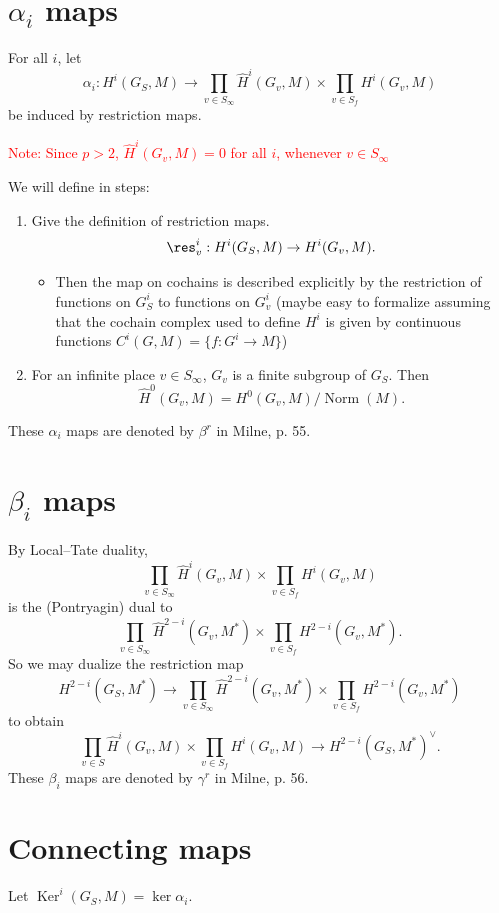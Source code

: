 \documentclass[11pt]{article}
\begin{document}
\section{$\alpha_i$ maps}
For all \( i \), let
\[ \alpha_i: H^i(G_{S},M)\to \prod_{v\in S_\infty}\widehat{H}^i(G_v,M)\times\prod_{v\in S_f}H^i(G_v,M) \]
be induced by restriction maps.

\textcolor{red}{Note: Since \( p>2 \), \( \widehat{H}^i(G_v,M)=0 \) for all \( i \), whenever \( v\in S_\infty \)}

\bigskip
We will define in steps:
\begin{enumerate}
    \item Give the definition of restriction maps.
\[
\res_v^i : H^i (G_S, M) \to H^i (G_v, M).
\]

\begin{itemize}
    \item Then the map on cochains is described explicitly by the restriction of functions on $G_S^i$ to functions on $G_v^i$ (maybe easy to formalize assuming that the cochain complex used to define $H^i$ is given by continuous functions \( C^i(G, M) = \{f: G^i \to M\} \))
\end{itemize}
\item For an infinite place \( v\in S_\infty \), \( G_v \) is a finite subgroup of \( G_S \). Then
\[ \widehat{H}^0(G_v,M) = H^0(G_v,M)/\operatorname{Norm}(M). \]
\end{enumerate}
These \( \alpha_i \) maps are denoted by \( \beta^r \) in Milne, p. 55.

\section{$\beta_i$ maps}

By Local--Tate duality,
\[ \prod_{v\in S_\infty}\widehat{H}^i(G_v,M)\times\prod_{v\in S_f}H^i(G_v,M) \]
is the (Pontryagin) dual to
\[ \prod_{v\in S_\infty}\widehat{H}^{2-i}(G_v,M^*)\times\prod_{v\in S_f}H^{2-i}(G_v,M^*). \]
So we may dualize the restriction map
\[ H^{2-i}(G_{S},M^*)\to \prod_{v\in S_\infty}\widehat{H}^{2-i}(G_v,M^*)\times\prod_{v\in S_f}H^{2-i}(G_v,M^*) \]
to obtain
\[ \prod_{v\in S}\widehat{H}^{i}(G_v,M)\times\prod_{v\in S_f}H^{i}(G_v,M)\to H^{2-i}(G_{S},M^*)^\vee. \]
These \( \beta_i \) maps are denoted by \( \gamma^r \) in Milne, p. 56.

\section{Connecting maps}
Let \( \operatorname{Ker}^i(G_S,M)=\ker \alpha_i \).
\end{document}
